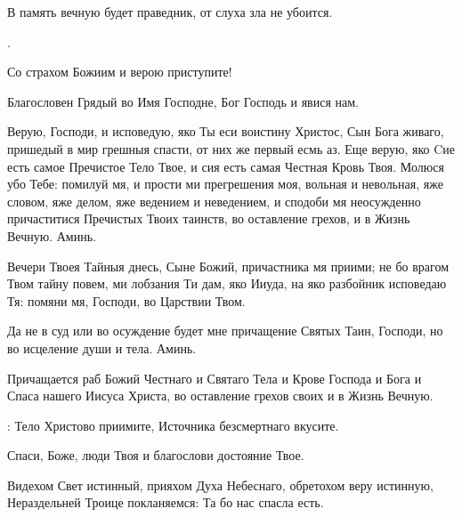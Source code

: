 \begin{mymulticols}
 В память вечную будет праведник, от слуха зла не убоится. 

.

 Со страхом Божиим и верою приступите! 


 Благословен Грядый во Имя Господне, Бог Господь и явися нам.


 Верую, Господи, и исповедую, яко Ты еси воистину Христос, Сын Бога живаго, пришедый в мир грешныя спасти, от них же первый есмь аз. Еще верую, яко Cие есть самое Пречистое Тело Твое, и сия есть самая Честная Кровь Твоя. Молюся убо Тебе: помилуй мя, и прости ми прегрешения моя, вольная и невольная, яже словом, яже делом, яже ведением и неведением, и сподоби мя неосужденно причаститися Пречистых Твоих таинств, во оставление грехов, и в Жизнь Вечную. Аминь.

Вечери Твоея Тайныя днесь, Сыне Божий, причастника мя приими; не бо врагом Твом тайну повем, ми лобзания Ти дам, яко Ииуда, на яко разбойник исповедаю Тя: помяни мя, Господи, во Царствии Твом.

Да не в суд или во осуждение будет мне причащение Святых Таин, Господи, но во исцеление души и тела. Аминь.


 Причащается раб Божий  Честнаго и Святаго Тела и Крове Господа и Бога и Спаса нашего Иисуса Христа, во оставление грехов своих и в Жизнь Вечную. 

: Тело Христово приимите, Источника безсмертнаго вкусите.


 Спаси, Боже, люди Твоя и благослови достояние Твое.


 Видехом Свет истинный, прияхом Духа Небеснаго, обретохом веру истинную, Нераздельней Троице покланяемся: Та бо нас спасла есть.


\end{mymulticols}
